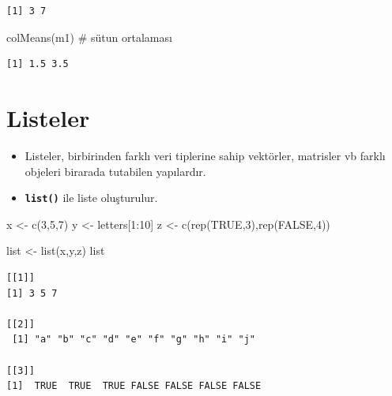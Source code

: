 \documentclass[
  letterpaper,
  DIV=11,
  numbers=noendperiod]{scrreprt}
\newenvironment{Shaded}{\begin{snugshade}}{\end{snugshade}}
\newcommand{\CommentTok}[1]{\textcolor[rgb]{0.37,0.37,0.37}{#1}}
\newcommand{\ConstantTok}[1]{\textcolor[rgb]{0.56,0.35,0.01}{#1}}
\newcommand{\DecValTok}[1]{\textcolor[rgb]{0.68,0.00,0.00}{#1}}
\newcommand{\FunctionTok}[1]{\textcolor[rgb]{0.28,0.35,0.67}{#1}}
\newcommand{\NormalTok}[1]{\textcolor[rgb]{0.00,0.23,0.31}{#1}}
\newcommand{\OtherTok}[1]{\textcolor[rgb]{0.00,0.23,0.31}{#1}}
\newcommand{\SpecialCharTok}[1]{\textcolor[rgb]{0.37,0.37,0.37}{#1}}
\begin{document}
\begin{verbatim}
[1] 3 7
\end{verbatim}

\begin{Shaded}
\begin{Highlighting}[]
\FunctionTok{colMeans}\NormalTok{(m1) }\CommentTok{\# sütun ortalaması}
\end{Highlighting}
\end{Shaded}

\begin{verbatim}
[1] 1.5 3.5
\end{verbatim}

\hypertarget{listeler}{%
\section{Listeler}\label{listeler}}

\begin{itemize}
\item
  Listeler, birbirinden farklı veri tiplerine sahip vektörler, matrisler
  vb farklı objeleri birarada tutabilen yapılardır.
\item
  \textbf{\texttt{list()}} ile liste oluşturulur.
\end{itemize}

\begin{Shaded}
\begin{Highlighting}[]
\NormalTok{x }\OtherTok{\textless{}{-}} \FunctionTok{c}\NormalTok{(}\DecValTok{3}\NormalTok{,}\DecValTok{5}\NormalTok{,}\DecValTok{7}\NormalTok{)}
\NormalTok{y }\OtherTok{\textless{}{-}}\NormalTok{ letters[}\DecValTok{1}\SpecialCharTok{:}\DecValTok{10}\NormalTok{]}
\NormalTok{z }\OtherTok{\textless{}{-}} \FunctionTok{c}\NormalTok{(}\FunctionTok{rep}\NormalTok{(}\ConstantTok{TRUE}\NormalTok{,}\DecValTok{3}\NormalTok{),}\FunctionTok{rep}\NormalTok{(}\ConstantTok{FALSE}\NormalTok{,}\DecValTok{4}\NormalTok{))}

\NormalTok{list }\OtherTok{\textless{}{-}} \FunctionTok{list}\NormalTok{(x,y,z)}
\NormalTok{list}
\end{Highlighting}
\end{Shaded}

\begin{verbatim}
[[1]]
[1] 3 5 7

[[2]]
 [1] "a" "b" "c" "d" "e" "f" "g" "h" "i" "j"

[[3]]
[1]  TRUE  TRUE  TRUE FALSE FALSE FALSE FALSE
\end{verbatim}
\end{document}
